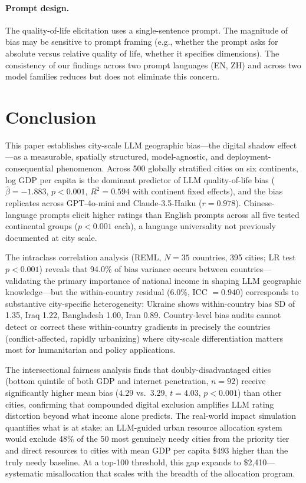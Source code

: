 \documentclass[12pt]{article}
\begin{document}
\paragraph{Prompt design.} The quality-of-life elicitation uses a single-sentence prompt. The magnitude of bias may be sensitive to prompt framing (e.g., whether the prompt asks for absolute versus relative quality of life, whether it specifies dimensions). The consistency of our findings across two prompt languages (EN, ZH) and across two model families reduces but does not eliminate this concern.

\section{Conclusion}
\label{sec:conclusion}

This paper establishes city-scale LLM geographic bias---the digital shadow effect---as a measurable, spatially structured, model-agnostic, and deployment-consequential phenomenon. Across 500 globally stratified cities on six continents, log GDP per capita is the dominant predictor of LLM quality-of-life bias ($\hat{\beta} = -1.883$, $p < 0.001$, $R^2 = 0.594$ with continent fixed effects), and the bias replicates across GPT-4o-mini and Claude-3.5-Haiku ($r = 0.978$). Chinese-language prompts elicit higher ratings than English prompts across all five tested continental groups ($p < 0.001$ each), a language universality not previously documented at city scale.

The intraclass correlation analysis (REML, $N = 35$ countries, 395 cities; LR test $p < 0.001$) reveals that 94.0\% of bias variance occurs between countries---validating the primary importance of national income in shaping LLM geographic knowledge---but the within-country residual (6.0\%, ICC $= 0.940$) corresponds to substantive city-specific heterogeneity: Ukraine shows within-country bias SD of 1.35, Iraq 1.22, Bangladesh 1.00, Iran 0.89. Country-level bias audits cannot detect or correct these within-country gradients in precisely the countries (conflict-affected, rapidly urbanizing) where city-scale differentiation matters most for humanitarian and policy applications.

The intersectional fairness analysis finds that doubly-disadvantaged cities (bottom quintile of both GDP and internet penetration, $n = 92$) receive significantly higher mean bias ($4.29$ vs.\ $3.29$, $t = 4.03$, $p < 0.001$) than other cities, confirming that compounded digital exclusion amplifies LLM rating distortion beyond what income alone predicts. The real-world impact simulation quantifies what is at stake: an LLM-guided urban resource allocation system would exclude 48\% of the 50 most genuinely needy cities from the priority tier and direct resources to cities with mean GDP per capita \$493 higher than the truly needy baseline. At a top-100 threshold, this gap expands to \$2,410---systematic misallocation that scales with the breadth of the allocation program.
\end{document}
